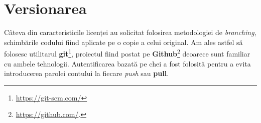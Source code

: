 \section{Versionarea}

Câteva din caracteristicile licenței au solicitat folosirea metodologiei de \emph{branching}, schimbările codului fiind aplicate pe o copie a celui original. Am ales astfel să folosesc utilitarul \textbf{git}\footnote{\url{https://git-scm.com/}}, proiectul fiind postat pe \textbf{Github}\footnote{\url{https://github.com/}.} deoarece sunt familiar cu ambele tehnologii. Autentificarea bazată pe chei a fost folosită pentru a evita introducerea parolei contului la fiecare \emph{push} sau \textbf{pull}.